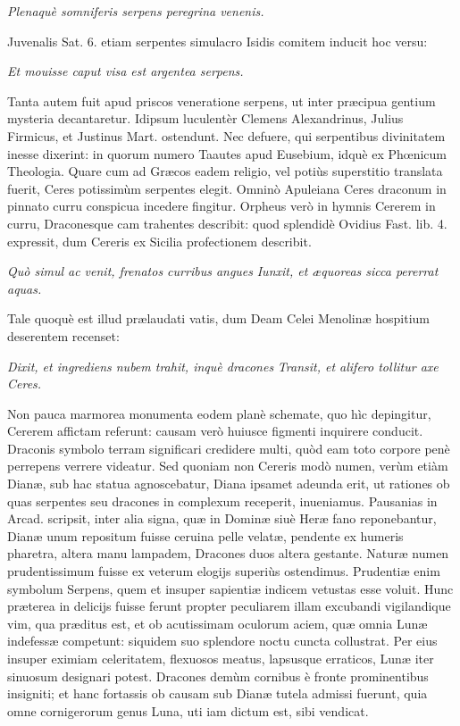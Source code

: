 \documentclass[a4paper, 11pt, oneside, polutonikogreek, latin]{article}
\begin{document}
\emph{Plenaquè somniferis serpens peregrina venenis.}

Juvenalis Sat. 6. etiam serpentes simulacro Isidis comitem inducit hoc versu:

\emph{Et mouisse caput visa est argentea serpens.}

Tanta autem fuit apud priscos veneratione serpens, ut inter præcipua gentium mysteria decantaretur. Idipsum luculentèr Clemens Alexandrinus, Julius Firmicus, et Justinus Mart. ostendunt. Nec defuere, qui serpentibus divinitatem inesse dixerint: in quorum numero Taautes apud Eusebium, idquè ex Phœnicum Theologia. Quare cum ad Græcos eadem religio, vel potiùs superstitio translata fuerit, Ceres potissimùm serpentes elegit. Omninò Apuleiana Ceres draconum in pinnato curru conspicua incedere fingitur. Orpheus verò in hymnis Cererem in curru, Draconesque cam trahentes describit: quod splendidè Ovidius Fast. lib. 4. expressit, dum Cereris ex Sicilia profectionem describit.

\emph{Quò simul ac venit, frenatos curribus angues}
\emph{Iunxit, et æquoreas sicca pererrat aquas.}

Tale quoquè est illud prælaudati vatis, dum Deam Celei Menolinæ hospitium deserentem recenset:

\emph{Dixit, et ingrediens nubem trahit, inquè dracones}
\emph{Transit, et alifero tollitur axe Ceres.}

Non pauca marmorea monumenta eodem planè schemate, quo hìc depingitur, Cererem affictam referunt: causam verò huiusce figmenti inquirere conducit. Draconis symbolo terram significari credidere multi, quòd eam toto corpore penè perrepens verrere videatur. Sed quoniam non Cereris modò numen, verùm etiàm Dianæ, sub hac statua agnoscebatur, Diana ipsamet adeunda erit, ut rationes ob quas serpentes seu dracones in complexum receperit, inueniamus. Pausanias in Arcad. scripsit, inter alia signa, quæ in Dominæ siuè Heræ fano reponebantur, Dianæ unum repositum fuisse ceruina pelle velatæ, pendente ex humeris pharetra, altera manu lampadem, Dracones duos altera gestante. Naturæ numen prudentissimum fuisse ex veterum elogijs superiùs ostendimus. Prudentiæ enim symbolum Serpens, quem et insuper sapientiæ indicem vetustas esse voluit. Hunc præterea in delicijs fuisse ferunt propter peculiarem illam excubandi vigilandique vim, qua præditus est, et ob acutissimam oculorum aciem, quæ omnia Lunæ indefessæ competunt: siquidem suo splendore noctu cuncta collustrat. Per eius insuper eximiam celeritatem, flexuosos meatus, lapsusque erraticos, Lunæ iter sinuosum designari potest. Dracones demùm cornibus è fronte prominentibus insigniti; et hanc fortassis ob causam sub Dianæ tutela admissi fuerunt, quia omne cornigerorum genus Luna, uti iam dictum est, sibi vendicat.
\clearpage
\end{document}
